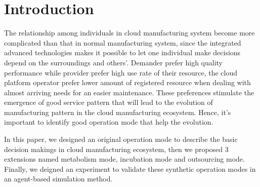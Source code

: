 \section{Introduction}
The relationship among individuals in cloud manufacturing system become more complicated than that in normal manufacturing system, since the integrated advanced technologies makes it possible to let one individual make decisions depend on the surroundings and others'. Demander prefer high quality performance while provider prefer high use rate of their resource, the cloud platform operator prefer lower amount of registered resource when dealing with almost arriving needs for an easier maintenance. These preferences stimulate the emergence of good service pattern that will lead to the evolution of manufacturing pattern in the cloud manufacturing ecosystem. Hence, it's important to identify good operation mode that help the evolution. 

In this paper, we designed an original operation mode to describe the basic decision makings in cloud manufacturing ecosystem, then we proposed 3 extensions named metabolism mode, incubation mode and outsourcing mode. Finally, we deigned an experiment to validate these synthetic operation modes in an agent-based simulation method.